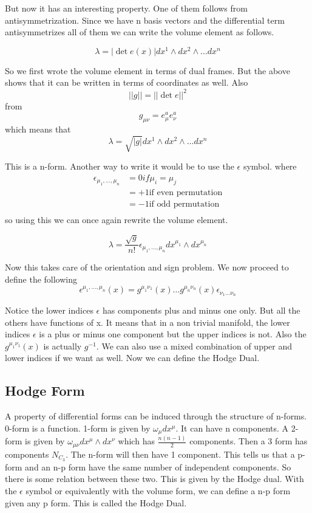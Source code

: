 \documentclass{article}
\begin{document}
But now it has an interesting property. One of them follows from antisymmetrization. Since we have n basis vectors and the differential term antisymmetrizes all of them
we can write the volume element as follows. 

\[ \lambda = |\det e(x)| dx^1 \wedge dx^2 \wedge \dots dx^n \]

So we first wrote the volume element in terms of dual frames. But the above shows that it can be written in terms of coordinates as well. Also 
\[ ||g|| = || \det e ||^2\]
from \[ g_{\mu \nu} = e^a_\mu e^a_\nu \]
which means that 
\[ \lambda = \sqrt{|g|} dx^1 \wedge dx^2 \wedge \dots dx^n  \]

This is a n-form. Another way to write it would be to use the \( \epsilon \) symbol. 
where 
\begin{align*}
    \epsilon_{\mu_1, \dots, \mu_n} &= 0 if \mu_i = \mu_j \\
                                   &= +1 \text{if even permutation}  \\
                                   &= -1 \text{if odd permutation} \\
\end{align*}
so using this we can once again rewrite the volume element. 

\[ \lambda = \frac{\sqrt{g}}{n!} \epsilon_{\mu_1, \dots, \mu_n} dx^{\mu_1}\wedge dx^{\mu_n} \]

Now this takes care of the orientation and sign problem. We now proceed to define the following 
\[ \epsilon^{\mu_1, \dots, \mu_n}(x) = g^{\mu_1 \nu_1}(x) \dots g^{\mu_n \nu_n}(x) \epsilon_{\nu_1 \dots \nu_n} \]

Notice the lower indices \( \epsilon \) has components plus and minus one only.  But all the others have functions of x. It means that in a non trivial manifold, the lower indices \(\epsilon\) is a plus or minus one component but the upper indices is not. Also the \( g^{\mu_1 \nu_1}(x) \) is actually \( g^{-1}\). We can also use a mixed combination of upper and lower indices if we want as well. Now we can define the Hodge Dual.

\subsection{Hodge Form}
A property of differential forms can be induced through the structure of n-forms. 0-form is a function. 1-form is given by \( \omega_\mu dx^\mu \). It can have n components. A 2-form is given by \( \omega_{\mu \nu} dx^\mu \wedge dx^\nu \) which has \( \frac{n(n-1)}{2}\) components. Then a 3 form has components \( N_{C_3} \). The n-form will then have 1 component. This tells us that a p-form and an n-p form have the same number of independent components. So there is some relation between these two. This is given by the Hodge dual. With the \( \epsilon\) symbol or equivalently with the volume form, we can define a n-p form given any p form. This is called the Hodge Dual. 
\end{document}
